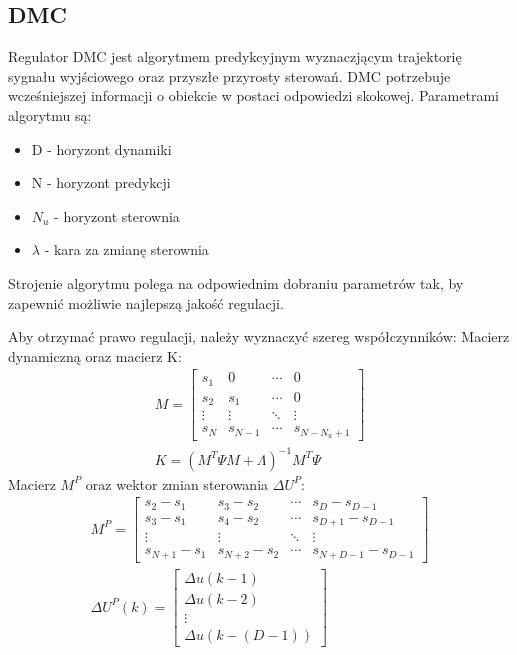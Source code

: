 \subsection{DMC}
Regulator DMC jest algorytmem predykcyjnym wyznaczjącym trajektorię sygnału wyjściowego oraz przyszłe przyrosty sterowań. DMC potrzebuje wcześniejszej informacji o obiekcie w postaci odpowiedzi skokowej. Parametrami algorytmu są:
\begin{itemize}
    \item D - horyzont dynamiki
    \item N - horyzont predykcji
    \item $N_u$ - horyzont sterownia
    \item $\lambda$ - kara za zmianę sterownia
\end{itemize}

Strojenie algorytmu polega na odpowiednim dobraniu parametrów tak, by zapewnić możliwie najlepszą jakość regulacji.

\par Aby otrzymać prawo regulacji, należy wyznaczyć szereg współczynników:
\newline Macierz dynamiczną oraz macierz K:
\begin{gather}
        M = \begin{bmatrix}
            s_1 & 0 & \cdots & 0\\
            s_2 & s_1 & \cdots & 0\\
            \vdots & \vdots & \ddots & \vdots \\
            s_N & s_{N-1} & \cdots & s_{N-N_u+1}
        \end{bmatrix} \\
         K = (M^T \Psi M + \Lambda)^{-1} M^T \Psi 
\end{gather}
\newline Macierz $M^P$ oraz wektor zmian sterowania $\Delta U^P$:
\begin{gather}
        M^P = \begin{bmatrix}
            s_2-s_1 & s_3-s_2 & \cdots & s_D-s_{D-1}\\
            s_3-s_1 & s_4-s_2 & \cdots & s_{D+1}-s_{D-1}\\
            \vdots & \vdots & \ddots & \vdots \\
            s_{N+1}-s_1 & s_{N+2}-s_2 & \cdots & s_{N+D-1}-s_{D-1}
        \end{bmatrix} \\
         \Delta U^P(k) = \begin{bmatrix}
            \Delta u(k-1)\\
            \Delta u(k-2)\\
            \vdots\\
            \Delta u(k-(D-1))
        \end{bmatrix}
\end{gather}

